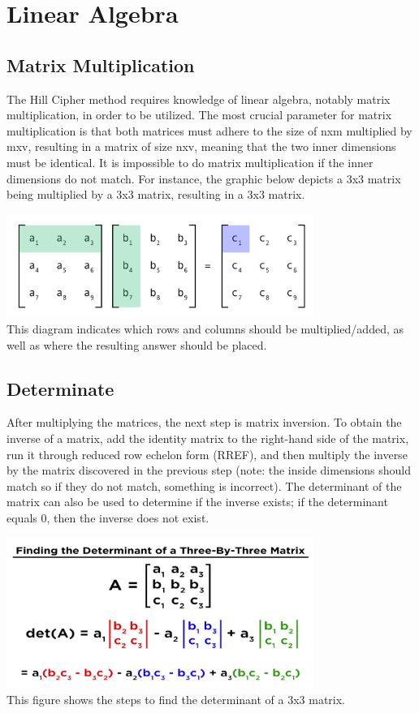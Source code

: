 \documentclass{article}
\begin{document}
\section*{Linear Algebra}
\subsection*{Matrix Multiplication}
The Hill Cipher method requires knowledge of linear algebra, notably matrix multiplication, in order to be utilized. The most crucial parameter for matrix multiplication is that both matrices must adhere to the size of nxm multiplied by mxv, resulting in a matrix of size nxv, meaning that the two inner dimensions must be identical. It is impossible to do matrix multiplication if the inner dimensions do not match. For instance, the graphic below depicts a 3x3 matrix being multiplied by a 3x3 matrix, resulting in a 3x3 matrix.

\begin{center}
\includegraphics[width=100mm]{mmul.png}
\\
 This diagram indicates which rows and columns should be multiplied/added, as well as where the resulting answer should be placed. 
\end{center}
\subsection*{Determinate}
After multiplying the matrices, the next step is matrix inversion. To obtain the inverse of a matrix, add the identity matrix to the right-hand side of the matrix, run it through reduced row echelon form (RREF), and then multiply the inverse by the matrix discovered in the previous step (note: the inside dimensions should match so if they do not match, something is incorrect). The determinant of the matrix can also be used to determine if the inverse exists; if the determinant equals 0, then the inverse does not exist.
\begin{center}
\includegraphics[width=100mm]{det.png}
\\
    This figure shows the steps to find the determinant of a 3x3 matrix.
\end{center}
\end{document}
